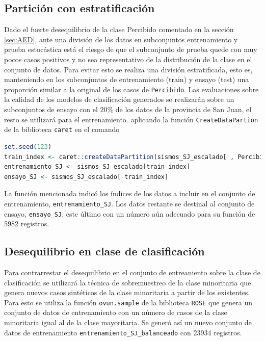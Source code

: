 \documentclass[a4paper]{report}
\begin{document}
\subsection{Partición con estratificación}\label{sec:partición}

Dado el fuerte desequilibrio de la clase Percibido comentado en la sección \ref{sec:AED}, ante una división de los datos en subconjuntos entrenamiento y prueba estocástica está el riesgo de que el subconjunto de prueba quede con muy pocos casos positivos y no sea representativo de la distribución de la clase en el conjunto de datos. 
Para evitar esto se realiza una división estratificada, esto es, 
manteniendo en los subconjuntos de entrenamiento (train) y ensayo (test) una proporción similar a la original de los casos de \verb'Percibido'.
Las evaluaciones sobre la calidad de los modelos de clasificación generados se realizarán sobre un subconjuntos de ensayo con el \(20 \%\) de los datos de la provincia de San Juan, el resto se utilizará para el entrenamiento.
aplicando la función \lstinline[language = R]'CreateDataPartion' de la biblioteca \lstinline[language = R]'caret' en el comando

\begin{lstlisting}[breaklines=true, language=R]
set.seed(123)
train_index <- caret::createDataPartition(sismos_SJ_escalado[ , Percibido], p = 0.8, list = FALSE)
entrenamiento_SJ <- sismos_SJ_escalado[train_index]
ensayo_SJ <- sismos_SJ_escalado[-train_index]
\end{lstlisting}

La función mencionada indicó los índices de los datos a incluir en el conjunto de entrenamiento, \lstinline[language = R]'entrenamiento_SJ'.
Los datos restante se destinal al conjunto de ensayo, \lstinline[language = R]'ensayo_SJ', este último con un número aún adecuado para su función de \num{5982} registros.


\subsection{Desequilibrio en clase de clasificación}\label{sec:balanceo}
Para contrarrestar el desequilibrio en el conjunto de entreaniento sobre la clase de clasificación se utilizará la técnica de sobremuestreo de la clase minoritaria que genera nuevos casos sintéticos de la clase minoritaria a partir de los existentes.
Para esto se utiliza la función \lstinline[language = R]'ovun.sample' de la biblioteca \lstinline[language = R]'ROSE' que genera un conjunto de datos de entrenamiento con un número de casos de la clase minoritaria igual al de la clase mayoritaria.
Se generó así un nuevo conjunto de datos de entrenamiento \lstinline[language = R]'entrenamiento_SJ_balanceado' con \num{23934} registros.
\end{document}
